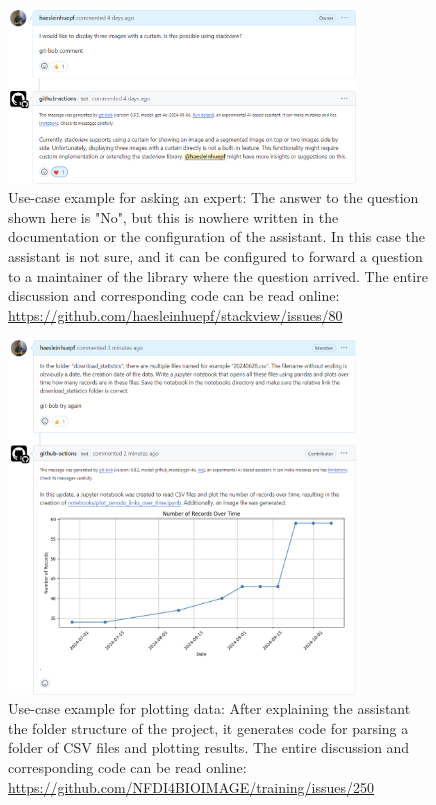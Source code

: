 \documentclass{ecai}
\begin{document}
\begin{figure}[h]
\centering
\includegraphics[width=0.82\textwidth]{example_supporting_users2.png}
\caption{Use-case example for asking an expert: The answer to the question shown here is "No", but this is nowhere written in the documentation or the configuration of the assistant. In this case the assistant is not sure, and it can be configured to forward a question to a maintainer of the library where the question arrived. The entire discussion and corresponding code can be read online: \url{https://github.com/haesleinhuepf/stackview/issues/80}
\newline
\newline
}
\label{fig:examplesupportingusers2}
\end{figure}


\begin{figure}[h]
\centering
\includegraphics[width=0.82\textwidth]{example_plotting.png}
\caption{Use-case example for plotting data: After explaining the assistant the folder structure of the project, it generates code for parsing a folder of CSV files and plotting results. The entire discussion and corresponding code can be read online: \url{https://github.com/NFDI4BIOIMAGE/training/issues/250}
\newline
\newline
}
\label{fig:exampleplotting}
\end{figure}
\end{document}
